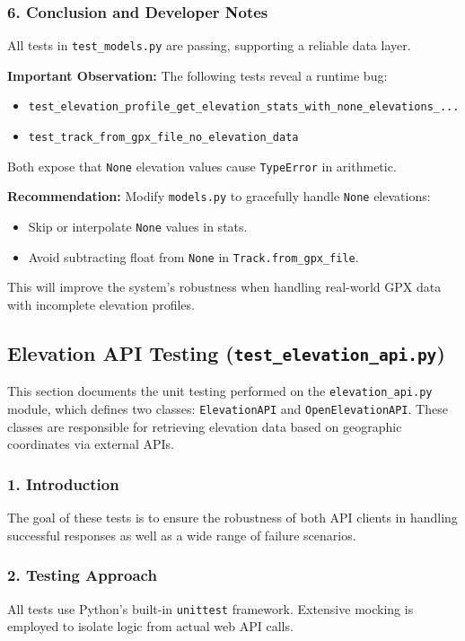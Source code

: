 \documentclass[12pt]{article}
\begin{document}
\subsubsection*{6. Conclusion and Developer Notes}
All tests in \texttt{test\_models.py} are passing, supporting a reliable data layer.

\textbf{Important Observation:} The following tests reveal a runtime bug:
\begin{itemize}
  \item \texttt{test\_elevation\_profile\_get\_elevation\_stats\_with\_none\_elevations\_...}
  \item \texttt{test\_track\_from\_gpx\_file\_no\_elevation\_data}
\end{itemize}
Both expose that \texttt{None} elevation values cause \texttt{TypeError} in arithmetic.

\textbf{Recommendation:} Modify \texttt{models.py} to gracefully handle \texttt{None} elevations:
\begin{itemize}
  \item Skip or interpolate \texttt{None} values in stats.
  \item Avoid subtracting float from \texttt{None} in \texttt{Track.from\_gpx\_file}.
\end{itemize}
This will improve the system's robustness when handling real-world GPX data with incomplete elevation profiles.

\subsection{Elevation API Testing (\texttt{test\_elevation\_api.py})}

This section documents the unit testing performed on the \texttt{elevation\_api.py} module, which defines two classes: \texttt{ElevationAPI} and \texttt{OpenElevationAPI}. These classes are responsible for retrieving elevation data based on geographic coordinates via external APIs.

\subsubsection*{1. Introduction}
The goal of these tests is to ensure the robustness of both API clients in handling successful responses as well as a wide range of failure scenarios.

\subsubsection*{2. Testing Approach}
All tests use Python's built-in \texttt{unittest} framework. Extensive mocking is employed to isolate logic from actual web API calls.
\end{document}
